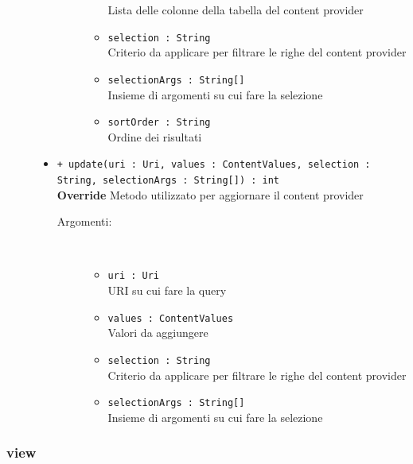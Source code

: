 \documentclass[../DefinizioneDiProdotto.tex]{subfiles}
\begin{document}
\begin{description}
\begin{itemize}
\begin{description}
\begin{itemize}
				Lista delle colonne della tabella del content provider\item \texttt{selection : String}\\
				Criterio da applicare per filtrare le righe del content provider\item \texttt{selectionArgs : String[]}\\
				Insieme di argomenti su cui fare la selezione\item \texttt{sortOrder : String}\\
				Ordine dei risultati\end{itemize}
		\end{description}
		\item \texttt{+ update(uri : Uri, values : ContentValues, selection : String, selectionArgs : String[]) : int}\\
		\textbf{Override} Metodo utilizzato per aggiornare il content provider
		\begin{description}
			\item[Argomenti:] \
			\begin{itemize}
				\item \texttt{uri : Uri}\\
				URI su cui fare la query\item \texttt{values : ContentValues}\\
				Valori da aggiungere\item \texttt{selection : String}\\
				Criterio da applicare per filtrare le righe del content provider\item \texttt{selectionArgs : String[]}\\
				Insieme di argomenti su cui fare la selezione\end{itemize}
		\end{description}
	\end{itemize}
\end{description}
\subsubsection{view}
\end{document}
